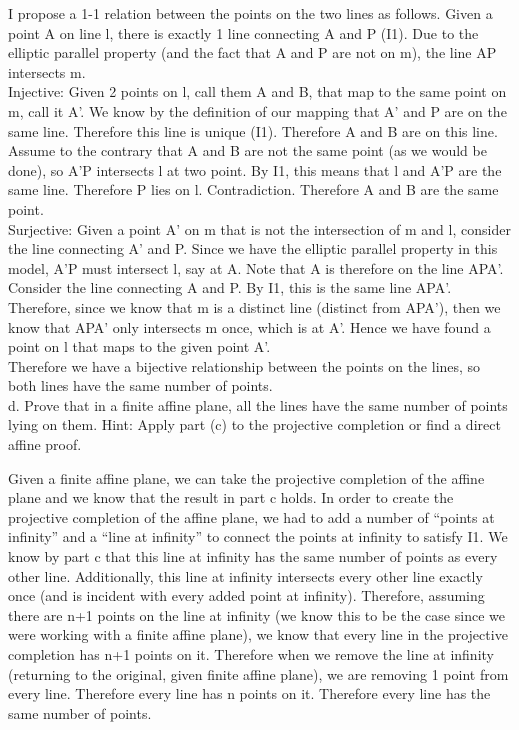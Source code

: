 \documentclass[12pt,letterpaper]{article}
\begin{document}
I propose a 1-1 relation between the points on the two lines as follows.  Given a point A on line l, there is exactly 1 line connecting A and P (I1).  Due to the elliptic parallel property (and the fact that A and P are not on m), the line AP intersects m.  \\

Injective: Given 2 points on l, call them A and B, that map to the same point on m, call it A'.  We know by the definition of our mapping that A' and P are on the same line.  Therefore this line is unique (I1).  Therefore A and B are on this line.  Assume to the contrary that A and B are not the same point (as we would be done), so A'P intersects l at two point.  By I1, this means that l and A'P are the same line.  Therefore P lies on l.  Contradiction.  Therefore A and B are the same point.\\

Surjective: Given a point A' on m that is not the intersection of m and l, consider the line connecting A' and P.  Since we have the elliptic parallel property in this model, A'P must intersect l, say at A.  Note that A is therefore on the line APA'.  Consider the line connecting A and P.  By I1, this is the same line APA'.  Therefore, since we know that m is a distinct line (distinct from APA'), then we know that APA' only intersects m once, which is at A'.  Hence we have found a point on l that maps to the given point A'.\\



Therefore we have a bijective relationship between the points on the lines, so both lines have the same number of points. \\



d.  Prove that in a finite affine plane, all the lines have the same number of points lying on them.  Hint: Apply part (c) to the projective completion or find a direct affine proof.

Given a finite affine plane, we can take the projective completion of the affine plane and we know that the result in part c holds.  In order to create the projective completion of the affine plane, we had to add a number of ``points at infinity'' and a ``line at infinity'' to connect the points at infinity to satisfy I1.  We know by part c that this line at infinity has the same number of points as every other line.  Additionally, this line at infinity intersects every other line exactly once (and is incident with every added point at infinity). Therefore, assuming there are n+1 points on the line at infinity (we know this to be the case since we were working with a finite affine plane), we know that every line in the projective completion has n+1 points on it.  Therefore when we remove the line at infinity (returning to the original, given finite affine plane), we are removing 1 point from every line.  Therefore every line has n points on it.  Therefore every line has the same number of points. 
\end{document}
